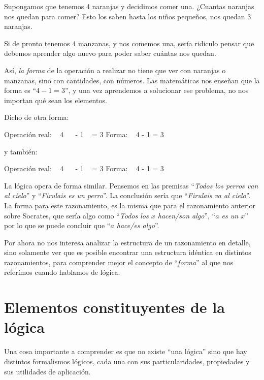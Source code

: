 \begin{example}
    \hspace*{14pt} Supongamos que tenemos 4 naranjas y decidimos comer una.
    ¿Cuantas naranjas nos quedan para comer? Esto los saben hasta los niños
    pequeños, nos quedan 3 naranjas.

    Si de pronto tenemos 4 manzanas, y nos comemos una, sería ridiculo pensar
    que debemos aprender algo nuevo para poder saber cuántas nos quedan.

    Así, \textit{la forma} de la operación a realizar no tiene que ver con
    naranjas o manzanas, sino con cantidades, con números. Las matemáticas nos
    enseñan que la forma es ``$4-1=3$'', y una vez aprendemos a solucionar ese
    problema, no nos importan qué sean los elementos.

    Dicho de otra forma:

    \dindent Operación real: ~ 4 \orange ~~ - 1 \orange ~ = 3 \orange \qquad
    Forma: ~ 4 - 1 = 3

    y también:

    \dindent Operación real: ~ 4 \apple ~~ - 1 \apple ~ = 3 \apple \qquad Forma:
    ~ 4 - 1 = 3
\end{example}

La lógica opera de forma similar. Pensemos en las premisas ``\textit{Todos los
perros van al cielo}'' y ``\textit{Firulais es un perro}''. La conclusión sería
que ``\textit{Firulais va al cielo}''. La forma para este razonamiento, es la
misma que para el razonamiento anterior sobre Socrates, que sería algo como
``\textit{Todos los $x$ hacen/son algo}'', ``\textit{$a$ es un $x$}'' por lo que
se puede concluir que ``\textit{$a$ hace/es algo}''.

Por ahora no nos interesa analizar la estructura de un razonamiento en detalle,
sino solamente ver que es posible encontrar una estructura idéntica en distintos
razonamientos, para comprender mejor el concepto de ``\textit{forma}'' al que
nos referímos cuando hablamos de lógica.

\section{Elementos constituyentes de la lógica}
\label{chap:logica:sec:elementos_constituyentes}

Una cosa importante a comprender es que no existe ``una lógica'' sino que hay distintos formalismos lógicos, cada una con sus particularidades, propiedades y sus utilidades de aplicación.

